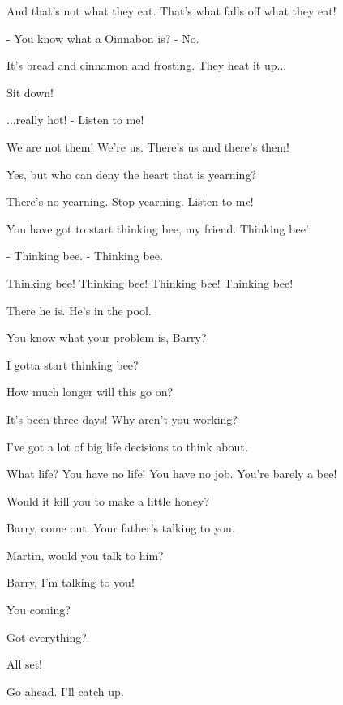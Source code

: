 \documentclass[journal]{IEEEtran}
\begin{document}
  
And that's not what they eat.
That's what falls off what they eat!

  
- You know what a Oinnabon is?
- No.

  
It's bread and cinnamon and frosting.
They heat it up...

  
Sit down!

  
...really hot!
- Listen to me!

  
We are not them! We're us.
There's us and there's them!

  
Yes, but who can deny
the heart that is yearning?

  
There's no yearning.
Stop yearning. Listen to me!

  
You have got to start thinking bee,
my friend. Thinking bee!

  
- Thinking bee.
- Thinking bee.

  
Thinking bee! Thinking bee!
Thinking bee! Thinking bee!

  
There he is. He's in the pool.

  
You know what your problem is, Barry?

  
I gotta start thinking bee?

  
How much longer will this go on?

  
It's been three days!
Why aren't you working?

  
I've got a lot of big life decisions
to think about.

  
What life? You have no life!
You have no job. You're barely a bee!

  
Would it kill you
to make a little honey?

  
Barry, come out.
Your father's talking to you.

  
Martin, would you talk to him?

  
Barry, I'm talking to you!

  
You coming?

  
Got everything?

  
All set!

  
Go ahead. I'll catch up.

  


%
%
%

\end{document}
